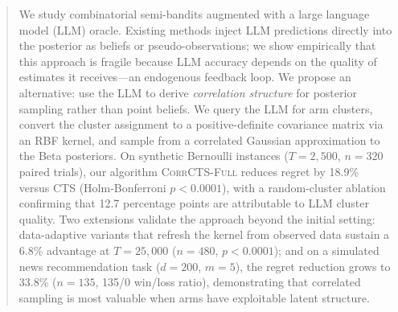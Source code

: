 \documentclass{article}
\theoremstyle{plain}
\theoremstyle{definition}
\theoremstyle{remark}
\newcommand{\CorrFull}{\textsc{CorrCTS-Full}}
\begin{document}

\printAffiliationsAndNotice{}

\begin{abstract}
We study combinatorial semi-bandits augmented with a large language model (LLM) oracle.
Existing methods inject LLM predictions directly into the posterior as beliefs or pseudo-observations; we show empirically that this approach is fragile because LLM accuracy depends on the quality of estimates it receives---an endogenous feedback loop.
We propose an alternative: use the LLM to derive \emph{correlation structure} for posterior sampling rather than point beliefs.
We query the LLM for arm clusters, convert the cluster assignment to a positive-definite covariance matrix via an RBF kernel, and sample from a correlated Gaussian approximation to the Beta posteriors.
On synthetic Bernoulli instances ($T{=}2{,}500$, $n{=}320$ paired trials), our algorithm \CorrFull{} reduces regret by 18.9\% versus CTS (Holm-Bonferroni $p < 0.0001$), with a random-cluster ablation confirming that 12.7 percentage points are attributable to LLM cluster quality.
Two extensions validate the approach beyond the initial setting: data-adaptive variants that refresh the kernel from observed data sustain a 6.8\% advantage at $T{=}25{,}000$ ($n{=}480$, $p < 0.0001$); and on a simulated news recommendation task ($d{=}200$, $m{=}5$), the regret reduction grows to 33.8\% ($n{=}135$, 135/0 win/loss ratio), demonstrating that correlated sampling is most valuable when arms have exploitable latent structure.
\end{abstract}
\end{document}

